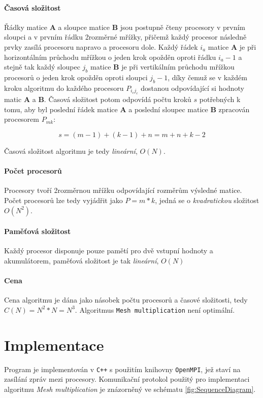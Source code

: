 \documentclass[12pt,a4paper,titlepage,final]{article}
\newcommand{\matr}[1]{\mathbf{#1}}
\begin{document}
\paragraph{Časová složitost}
Řádky matice $\matr{A}$ a sloupce matice $\matr{B}$ jsou postupně čteny procesory v prvním sloupci a v prvním řádku 2rozměrné mřížky, přičemž každý procesor následně prvky zasílá procesoru napravo a procesoru dole. Každý řádek $i_{a}$ matice $\matr{A}$ je při horizontálním průchodu mřížkou o jeden krok opožděn oproti řádku $i_{a} - 1$ a stejně tak každý sloupec $j_{b}$ matice $\matr{B}$ je při vertikálním průchodu mřížkou procesorů o jeden krok opožděn oproti sloupci $j_{b} - 1$, díky čemuž se v každém kroku algoritmu do každého procesoru $P_{i_{c}j_{c}}$ dostanou odpovídající si hodnoty matic $\matr{A}$ a $\matr{B}$. Časová složitost potom odpovídá počtu kroků $s$ potřebných k tomu, aby byl poslední řádek matice $\matr{A}$ a poslední sloupec matice $\matr{B}$ zpracován procesorem $P_{mk}$:

\begin{equation}
s = (m - 1) + (k - 1) + n = m + n + k -2
\end{equation}

Časová složitost algoritmu je tedy \textit{lineární}, $O(N)$.

\paragraph{Počet procesorů}
Procesory tvoří 2rozměrnou mřížku odpovídající rozměrům výsledné matice. Počet procesorů lze tedy vyjádřit jako $P = m * k$, jedná se o \textit{kvadratickou} složitost $O(N^{2})$.

\paragraph{Paměťová složitost}
Každý procesor disponuje pouze pamětí pro dvě vstupní hodnoty a akumulátorem, paměťová složitost je tak \textit{lineární}, $O(N)$

\paragraph{Cena}
Cena algoritmu je dána jako násobek počtu procesorů a časové složitosti, tedy $C(N) = N^{2}*N = N^{3}$. Algoritmus \texttt{Mesh multiplication} není optimální.

\section{Implementace}
Program je implementován v \texttt{C++} s použitím knihovny \texttt{OpenMPI}, jež staví na zasílání zpráv mezi procesory. Komunikační protokol použitý pro implementaci algoritmu \textit{Mesh multiplication} je znázorněný ve schématu \ref{fig:SequenceDiagram}. 
\end{document}
